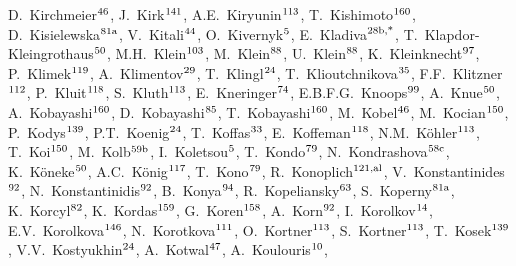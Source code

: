 \begin{flushleft}
D.~Kirchmeier$^\textrm{\scriptsize 46}$,    
J.~Kirk$^\textrm{\scriptsize 141}$,    
A.E.~Kiryunin$^\textrm{\scriptsize 113}$,    
T.~Kishimoto$^\textrm{\scriptsize 160}$,    
D.~Kisielewska$^\textrm{\scriptsize 81a}$,    
V.~Kitali$^\textrm{\scriptsize 44}$,    
O.~Kivernyk$^\textrm{\scriptsize 5}$,    
E.~Kladiva$^\textrm{\scriptsize 28b,*}$,    
T.~Klapdor-Kleingrothaus$^\textrm{\scriptsize 50}$,    
M.H.~Klein$^\textrm{\scriptsize 103}$,    
M.~Klein$^\textrm{\scriptsize 88}$,    
U.~Klein$^\textrm{\scriptsize 88}$,    
K.~Kleinknecht$^\textrm{\scriptsize 97}$,    
P.~Klimek$^\textrm{\scriptsize 119}$,    
A.~Klimentov$^\textrm{\scriptsize 29}$,    
T.~Klingl$^\textrm{\scriptsize 24}$,    
T.~Klioutchnikova$^\textrm{\scriptsize 35}$,    
F.F.~Klitzner$^\textrm{\scriptsize 112}$,    
P.~Kluit$^\textrm{\scriptsize 118}$,    
S.~Kluth$^\textrm{\scriptsize 113}$,    
E.~Kneringer$^\textrm{\scriptsize 74}$,    
E.B.F.G.~Knoops$^\textrm{\scriptsize 99}$,    
A.~Knue$^\textrm{\scriptsize 50}$,    
A.~Kobayashi$^\textrm{\scriptsize 160}$,    
D.~Kobayashi$^\textrm{\scriptsize 85}$,    
T.~Kobayashi$^\textrm{\scriptsize 160}$,    
M.~Kobel$^\textrm{\scriptsize 46}$,    
M.~Kocian$^\textrm{\scriptsize 150}$,    
P.~Kodys$^\textrm{\scriptsize 139}$,    
P.T.~Koenig$^\textrm{\scriptsize 24}$,    
T.~Koffas$^\textrm{\scriptsize 33}$,    
E.~Koffeman$^\textrm{\scriptsize 118}$,    
N.M.~K\"ohler$^\textrm{\scriptsize 113}$,    
T.~Koi$^\textrm{\scriptsize 150}$,    
M.~Kolb$^\textrm{\scriptsize 59b}$,    
I.~Koletsou$^\textrm{\scriptsize 5}$,    
T.~Kondo$^\textrm{\scriptsize 79}$,    
N.~Kondrashova$^\textrm{\scriptsize 58c}$,    
K.~K\"oneke$^\textrm{\scriptsize 50}$,    
A.C.~K\"onig$^\textrm{\scriptsize 117}$,    
T.~Kono$^\textrm{\scriptsize 79}$,    
R.~Konoplich$^\textrm{\scriptsize 121,al}$,    
V.~Konstantinides$^\textrm{\scriptsize 92}$,    
N.~Konstantinidis$^\textrm{\scriptsize 92}$,    
B.~Konya$^\textrm{\scriptsize 94}$,    
R.~Kopeliansky$^\textrm{\scriptsize 63}$,    
S.~Koperny$^\textrm{\scriptsize 81a}$,    
K.~Korcyl$^\textrm{\scriptsize 82}$,    
K.~Kordas$^\textrm{\scriptsize 159}$,    
G.~Koren$^\textrm{\scriptsize 158}$,    
A.~Korn$^\textrm{\scriptsize 92}$,    
I.~Korolkov$^\textrm{\scriptsize 14}$,    
E.V.~Korolkova$^\textrm{\scriptsize 146}$,    
N.~Korotkova$^\textrm{\scriptsize 111}$,    
O.~Kortner$^\textrm{\scriptsize 113}$,    
S.~Kortner$^\textrm{\scriptsize 113}$,    
T.~Kosek$^\textrm{\scriptsize 139}$,    
V.V.~Kostyukhin$^\textrm{\scriptsize 24}$,    
A.~Kotwal$^\textrm{\scriptsize 47}$,    
A.~Koulouris$^\textrm{\scriptsize 10}$,    

\end{flushleft}
